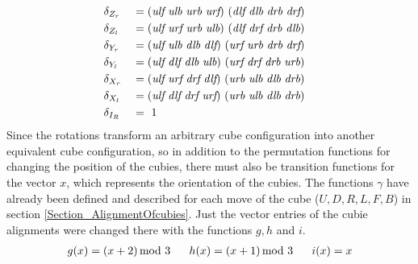 \documentclass[12pt,a4paper]{article}
\theoremstyle{custom}
\begin{document}
\begin{alignat*}{2}
& \delta_{Z_r} && = ( \textit{ulf} \ \textit{ulb} \ \textit{urb} \ \textit{urf})\ (\textit{dlf} \ \textit{dlb} \ \textit{drb} \ \textit{drf} )\\
& \delta_{Z_l} && = ( \textit{ulf} \ \textit{urf} \ \textit{urb} \ \textit{ulb})\ (\textit{dlf} \ \textit{drf} \ \textit{drb} \ \textit{dlb} )\\
& \delta_{Y_r} && = ( \textit{ulf} \ \textit{ulb} \ \textit{dlb} \ \textit{dlf})\ ( \textit{urf} \ \textit{urb} \ \textit{drb} \ \textit{drf} )\\
& \delta_{Y_l} && = ( \textit{ulf} \ \textit{dlf} \ \textit{dlb} \ \textit{ulb})\ ( \textit{urf} \ \textit{drf} \ \textit{drb} \ \textit{urb} )\\
& \delta_{X_r} && = ( \textit{ulf} \ \textit{urf} \ \textit{drf} \ \textit{dlf})\ ( \textit{urb} \ \textit{ulb} \ \textit{dlb} \ \textit{drb} )\\
& \delta_{X_l} && = ( \textit{ulf} \ \textit{dlf} \ \textit{drf} \ \textit{urf})\ (\textit{urb} \ \textit{ulb} \ \textit{dlb} \ \textit{drb} )\\
& \delta_{I_R} && = \ 1 \hspace*{14.1em}
\end{alignat*}
Since the rotations transform an arbitrary cube configuration into another equivalent cube configuration, so in addition to the permutation functions for changing the position of the cubies, there must also be transition functions for the vector $x$, which represents the orientation of the cubies. The functions $\gamma$ have already been defined and described for each move of the cube ($U, D, R, L, F, B$) in section \ref{Section_AlignmentOfcubies}. Just the vector entries of the cubie alignments were changed there with the functions $g, h$ and $i$.
\begin{align*}
g(x)=(x + 2) \hspace*{-0.5em} \mod 3 \ \ \ \ \ h(x) = (x+1) \hspace*{-0.5em} \mod 3 \ \ \ \ \ i(x)=x
\end{align*}
\end{document}
